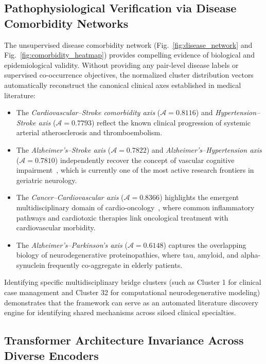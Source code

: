 \documentclass[a4paper,fleqn]{cas-dc}
\begin{document}
\subsection{Pathophysiological Verification via Disease Comorbidity Networks}

The unsupervised disease comorbidity network (Fig.~\ref{fig:disease_network} and Fig.~\ref{fig:comorbidity_heatmap}) provides compelling evidence of biological and epidemiological validity. Without providing any pair-level disease labels or supervised co-occurrence objectives, the normalized cluster distribution vectors automatically reconstruct the canonical clinical axes established in medical literature:
\begin{itemize}
\item The \textit{Cardiovascular--Stroke comorbidity axis} ($\mathcal{A}=0.8116$) and \textit{Hypertension--Stroke axis} ($\mathcal{A}=0.7793$) reflect the known clinical progression of systemic arterial atherosclerosis and thromboembolism.
\item The \textit{Alzheimer's--Stroke axis} ($\mathcal{A}=0.7822$) and \textit{Alzheimer's--Hypertension axis} ($\mathcal{A}=0.7810$) independently recover the concept of vascular cognitive impairment~\cite{ref40}, which is currently one of the most active research frontiers in geriatric neurology.
\item The \textit{Cancer--Cardiovascular axis} ($\mathcal{A}=0.8366$) highlights the emergent multidisciplinary domain of cardio-oncology~\cite{ref39}, where common inflammatory pathways and cardiotoxic therapies link oncological treatment with cardiovascular morbidity.
\item The \textit{Alzheimer's--Parkinson's axis} ($\mathcal{A}=0.6148$) captures the overlapping biology of neurodegenerative proteinopathies, where tau, amyloid, and alpha-synuclein frequently co-aggregate in elderly patients.
\end{itemize}
Identifying specific multidisciplinary bridge clusters (such as Cluster 1 for clinical case management and Cluster 32 for computational neurodegenerative modeling) demonstrates that the framework can serve as an automated literature discovery engine for identifying shared mechanisms across siloed clinical specialties.

\subsection{Transformer Architecture Invariance Across Diverse Encoders}
\end{document}
